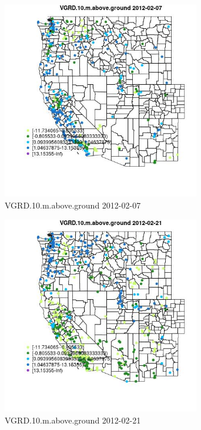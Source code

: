 \begin{figure} 
\centering  
\includegraphics[width=0.77\textwidth]{Code_Outputs/Report_ML_input_PM25_Step4_part_f_de_duplicated_aveswNAs_MapObsVGRD10maboveground2012-02-07.jpg} 
\caption{\label{fig:Report_ML_input_PM25_Step4_part_f_de_duplicated_aveswNAsMapObsVGRD10maboveground2012-02-07}VGRD.10.m.above.ground 2012-02-07} 
\end{figure} 
 

\clearpage 

\begin{figure} 
\centering  
\includegraphics[width=0.77\textwidth]{Code_Outputs/Report_ML_input_PM25_Step4_part_f_de_duplicated_aveswNAs_MapObsVGRD10maboveground2012-02-21.jpg} 
\caption{\label{fig:Report_ML_input_PM25_Step4_part_f_de_duplicated_aveswNAsMapObsVGRD10maboveground2012-02-21}VGRD.10.m.above.ground 2012-02-21} 
\end{figure} 
 

